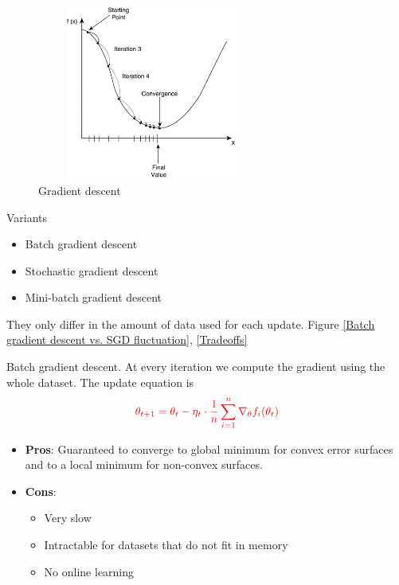 \documentclass[english]{article}
\begin{document}
\begin{figure}
\begin{center}
\includegraphics[width = 7.5cm, height = 5.75cm]{gradient_descent_2d2.png}
    \caption{Gradient descent}
    \label{Gradient descent}
\end{center}
\end{figure}






\item {Variants}
\begin{itemize}
\item Batch gradient descent 
\item Stochastic gradient descent 
\item Mini-batch gradient descent
\end{itemize}


They only differ in the amount of data used for each update. Figure \ref{Batch gradient descent vs. SGD fluctuation}, \ref{Tradeoffs}






\item {Batch gradient descent}.
At every iteration we compute the gradient using the whole dataset. The update equation is
$$\textcolor{red}{\theta_{t+1} = \theta_t - \eta_t \cdot \frac1n \sum_{i=1}^n \nabla_\theta f_i(\theta_t)}$$

\begin{itemize}
\item \textbf{Pros}: Guaranteed to converge to global minimum for convex error surfaces and to a local minimum for non-convex surfaces.
\item \textbf{Cons}:
\begin{itemize}
\item Very slow
\item Intractable for datasets that do not fit in memory
\item No online learning
\end{itemize}
\end{itemize}
\end{document}
